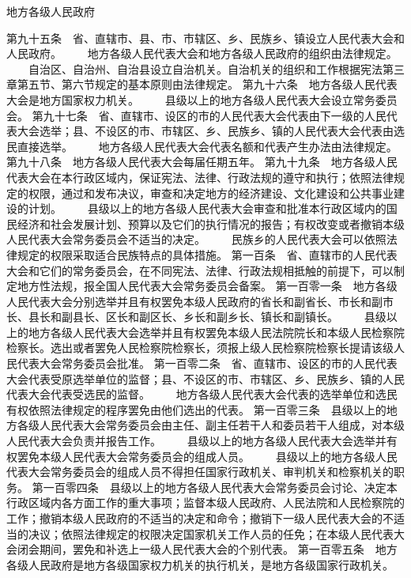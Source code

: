 地方各级人民政府

     第九十五条　省、直辖市、县、市、市辖区、乡、民族乡、镇设立人民代表大会和人民政府。
　　地方各级人民代表大会和地方各级人民政府的组织由法律规定。
 　　自治区、自治州、自治县设立自治机关。自治机关的组织和工作根据宪法第三章第五节、第六节规定的基本原则由法律规定。
     第九十六条　地方各级人民代表大会是地方国家权力机关。
　　县级以上的地方各级人民代表大会设立常务委员会。
     第九十七条　省、直辖市、设区的市的人民代表大会代表由下一级的人民代表大会选举；县、不设区的市、市辖区、乡、民族乡、镇的人民代表大会代表由选民直接选举。
　　地方各级人民代表大会代表名额和代表产生办法由法律规定。
     第九十八条　地方各级人民代表大会每届任期五年。
     第九十九条　地方各级人民代表大会在本行政区域内，保证宪法、法律、行政法规的遵守和执行；依照法律规定的权限，通过和发布决议，审查和决定地方的经济建设、文化建设和公共事业建设的计划。
 　　县级以上的地方各级人民代表大会审查和批准本行政区域内的国民经济和社会发展计划、预算以及它们的执行情况的报告；有权改变或者撤销本级人民代表大会常务委员会不适当的决定。
　　民族乡的人民代表大会可以依照法律规定的权限采取适合民族特点的具体措施。
     第一百条　省、直辖市的人民代表大会和它们的常务委员会，在不同宪法、法律、行政法规相抵触的前提下，可以制定地方性法规，报全国人民代表大会常务委员会备案。
     第一百零一条　地方各级人民代表大会分别选举并且有权罢免本级人民政府的省长和副省长、市长和副市长、县长和副县长、区长和副区长、乡长和副乡长、镇长和副镇长。
 　　县级以上的地方各级人民代表大会选举并且有权罢免本级人民法院院长和本级人民检察院检察长。选出或者罢免人民检察院检察长，须报上级人民检察院检察长提请该级人民代表大会常务委员会批准。
     第一百零二条　省、直辖市、设区的市的人民代表大会代表受原选举单位的监督；县、不设区的市、市辖区、乡、民族乡、镇的人民代表大会代表受选民的监督。
　　地方各级人民代表大会代表的选举单位和选民有权依照法律规定的程序罢免由他们选出的代表。
     第一百零三条　县级以上的地方各级人民代表大会常务委员会由主任、副主任若干人和委员若干人组成，对本级人民代表大会负责并报告工作。
　　县级以上的地方各级人民代表大会选举并有权罢免本级人民代表大会常务委员会的组成人员。
 　　县级以上的地方各级人民代表大会常务委员会的组成人员不得担任国家行政机关、审判机关和检察机关的职务。
     第一百零四条　县级以上的地方各级人民代表大会常务委员会讨论、决定本行政区域内各方面工作的重大事项；监督本级人民政府、人民法院和人民检察院的工作；撤销本级人民政府的不适当的决定和命令；撤销下一级人民代表大会的不适当的决议；依照法律规定的权限决定国家机关工作人员的任免；在本级人民代表大会闭会期间，罢免和补选上一级人民代表大会的个别代表。
     第一百零五条　地方各级人民政府是地方各级国家权力机关的执行机关，是地方各级国家行政机关。
